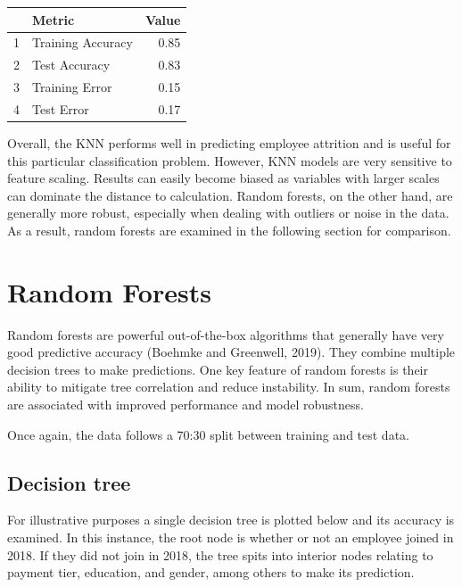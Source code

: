 \documentclass[11pt,preprint, authoryear]{elsarticle}
\let\origtable\table
\let\endorigtable\endtable
\renewenvironment{table}[1][2] {
    \expandafter\origtable\expandafter[H]
} {
    \endorigtable
}
\numberwithin{equation}{section}
\numberwithin{figure}{section}
\numberwithin{table}{section}
\begin{document}
\begin{table}[H]
\centering
\begin{tabular}{rlr}
  \hline
 & Metric & Value \\ 
  \hline
1 & Training Accuracy & 0.85 \\ 
  2 & Test Accuracy & 0.83 \\ 
  3 & Training Error & 0.15 \\ 
  4 & Test Error & 0.17 \\ 
   \hline
\end{tabular}
\caption{More Metrics for KNN Model \label{tab1}} 
\end{table}

Overall, the KNN performs well in predicting employee attrition and is
useful for this particular classification problem. However, KNN models
are very sensitive to feature scaling. Results can easily become biased
as variables with larger scales can dominate the distance to
calculation. Random forests, on the other hand, are generally more
robust, especially when dealing with outliers or noise in the data. As a
result, random forests are examined in the following section for
comparison.

\hypertarget{random-forests}{%
\section*{Random Forests}\label{random-forests}}

Random forests are powerful out-of-the-box algorithms that generally
have very good predictive accuracy (Boehmke and Greenwell, 2019). They
combine multiple decision trees to make predictions. One key feature of
random forests is their ability to mitigate tree correlation and reduce
instability. In sum, random forests are associated with improved
performance and model robustness.

Once again, the data follows a 70:30 split between training and test
data.

\hypertarget{decision-tree}{%
\subsection*{Decision tree}\label{decision-tree}}

For illustrative purposes a single decision tree is plotted below and
its accuracy is examined. In this instance, the root node is whether or
not an employee joined in 2018. If they did not join in 2018, the tree
spits into interior nodes relating to payment tier, education, and
gender, among others to make its prediction.
\end{document}
